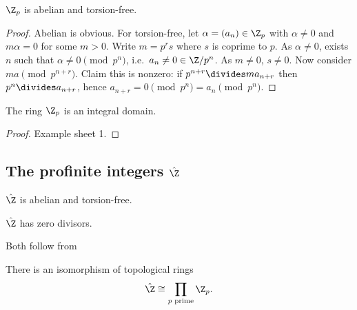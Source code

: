 \documentclass[a4paper]{article}
\begin{document}
\begin{proposition}
  \(\Z_p\) is abelian and torsion-free.
\end{proposition}

\begin{proof}
  Abelian is obvious. For torsion-free, let \(\alpha = (a_n) \in \Z_p\) with \(\alpha \ne 0\) and \(m\alpha = 0\) for some \(m > 0\). Write \(m = p^rs\) where \(s\) is coprime to \(p\). As \(\alpha \ne 0\), exists \(n\) such that \(\alpha \ne 0 \pmod{p^n}\), i.e.\ \(a_n \ne 0 \in \Z/p^n\). As \(m \ne 0\), \(s \ne 0\). Now consider \(ma \pmod{p^{n + r}}\). Claim this is nonzero: if \(p^{n + r} \divides ma_{n + r}\) then \(p^n \divides  a_{n + r}\), hence \(a_{n + r} = 0 \pmod{p^n} = a_n \pmod{p^n}\).
\end{proof}

\begin{proposition}
  The ring \(\Z_p\) is an integral domain.
\end{proposition}

\begin{proof}
  Example sheet 1.
\end{proof}

\subsection{The profinite integers \(\hat \Z\)}

\begin{proposition}
  \(\hat \Z\) is abelian and torsion-free.
\end{proposition}

\begin{proposition}
  \(\hat \Z\) has zero divisors.
\end{proposition}

Both follow from

\begin{theorem}
  There is an isomorphism of topological rings
  \[
    \hat \Z \cong \prod_{p \textup{ prime}} \Z_p.
  \]
\end{theorem}
\end{document}
